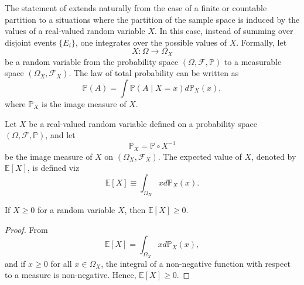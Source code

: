 \begin{remark}
	The statement of  extends naturally from the case of a finite or countable partition to a situations where the partition of the sample space is induced by the values of a real-valued random variable $X$. In this case, instead of summing over disjoint events $\{E_i\}$, one integrates over the possible values of $X$. Formally, let 
	\begin{equation}
		X: \Omega \to \Omega_X
	\end{equation}
	be a random variable from the probability space $(\Omega, \mathcal{F}, \mathbb{P})$ to a measurable space $(\Omega_X, \mathcal{F}_X)$. The law of total probability can be written as
	\begin{equation}
		\mathbb{P}(A) = \int \mathbb{P}(A \mid X = x) d\mathbb{P}_X(x),
	\end{equation}
	where $\mathbb{P}_X$ is the image measure of $X$. 
\end{remark}

\begin{definition}
	\label{def:expectation_image}
	Let $X$ be a real-valued random variable defined on a probability space $(\Omega, \mathcal{F},\mathbb{P})$, and let
	\begin{equation}
		\mathbb{P}_X = \mathbb{P} \circ X^{-1}
	\end{equation} 
	be the image measure of $X$ on $(\Omega_X, \mathcal{F}_X)$. The expected value of $X$, denoted by $\mathbb{E}[X]$, is defined viz
	\begin{equation}
		\mathbb{E}[X] \equiv \int_{\Omega_X} x d\mathbb{P}_X(x).
		\label{eq:expected_value_image}
	\end{equation}
\end{definition}

\begin{theorem}
	If $X\geq 0$ for a random variable $X$, then $\mathbb{E}[X]\geq 0$.
\end{theorem}
\begin{proof}
	From  
	\begin{equation}
		\mathbb{E}[X] = \int_{\Omega_X}x d\mathbb{P}_X(x),
	\end{equation}
	and if $x \ge 0$ for all $x \in \Omega_X$, the integral of a non-negative function with respect to a measure is non-negative. Hence, $\mathbb{E}[X] \ge 0$.
\end{proof}

